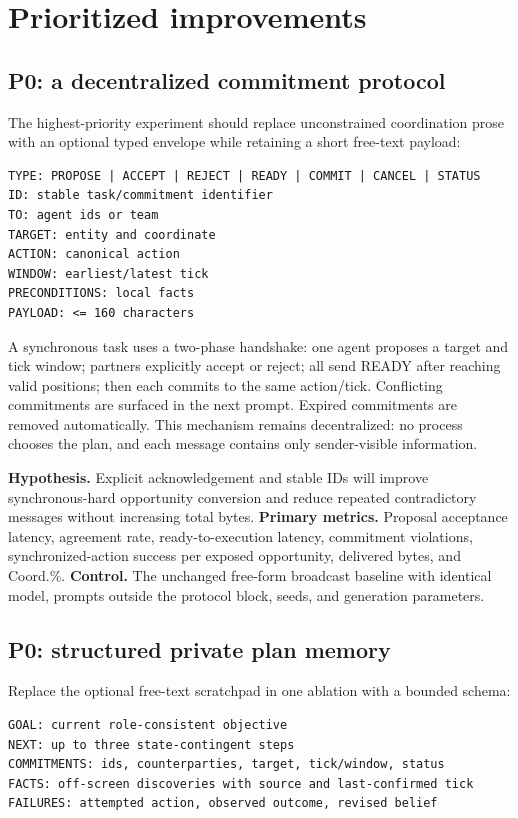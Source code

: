\documentclass[11pt]{article}
\begin{document}
\section{Prioritized improvements}

\subsection{P0: a decentralized commitment protocol}

The highest-priority experiment should replace unconstrained coordination prose with an optional
typed envelope while retaining a short free-text payload:

\begin{verbatim}
TYPE: PROPOSE | ACCEPT | REJECT | READY | COMMIT | CANCEL | STATUS
ID: stable task/commitment identifier
TO: agent ids or team
TARGET: entity and coordinate
ACTION: canonical action
WINDOW: earliest/latest tick
PRECONDITIONS: local facts
PAYLOAD: <= 160 characters
\end{verbatim}

A synchronous task uses a two-phase handshake: one agent proposes a target and tick window;
partners explicitly accept or reject; all send READY after reaching valid positions; then each commits
to the same action/tick.  Conflicting commitments are surfaced in the next prompt.  Expired
commitments are removed automatically.  This mechanism remains decentralized: no process chooses
the plan, and each message contains only sender-visible information.

\textbf{Hypothesis.} Explicit acknowledgement and stable IDs will improve synchronous-hard
opportunity conversion and reduce repeated contradictory messages without increasing total bytes.
\textbf{Primary metrics.} Proposal acceptance latency, agreement rate, ready-to-execution latency,
commitment violations, synchronized-action success per exposed opportunity, delivered bytes, and
Coord.\%.  \textbf{Control.} The unchanged free-form broadcast baseline with identical model,
prompts outside the protocol block, seeds, and generation parameters.

\subsection{P0: structured private plan memory}

Replace the optional free-text scratchpad in one ablation with a bounded schema:

\begin{verbatim}
GOAL: current role-consistent objective
NEXT: up to three state-contingent steps
COMMITMENTS: ids, counterparties, target, tick/window, status
FACTS: off-screen discoveries with source and last-confirmed tick
FAILURES: attempted action, observed outcome, revised belief
\end{verbatim}
\end{document}
